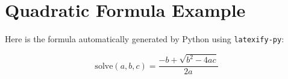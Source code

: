\documentclass[12pt]{article}
\begin{document}
\section*{Quadratic Formula Example}

Here is the formula automatically generated by Python using \texttt{latexify-py}:

\[
\mathrm{solve}(a, b, c) = \frac{-b + \sqrt{b^{2} - 4 a c}}{2 a}
\]
\end{document}
